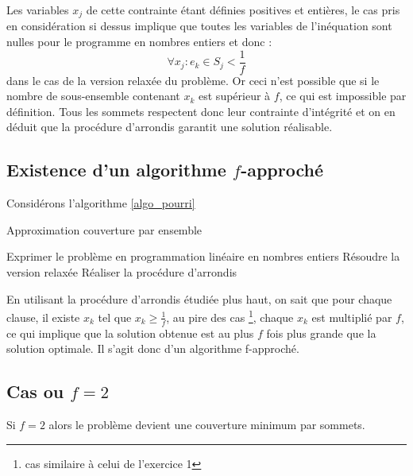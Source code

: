 Les variables $x_j$ de cette contrainte étant définies positives et entières, le cas pris en
considération si dessus implique que toutes les variables de l'inéquation sont nulles pour le
programme en nombres entiers et donc : $$
\forall x_j : e_k \in S_j < \frac{1}{f} $$ dans le cas de la version relaxée du problème. Or ceci
n'est possible que si le nombre de sous-ensemble contenant $x_k$ est supérieur à $f$, ce qui est
impossible par définition. Tous les sommets respectent donc leur contrainte d'intégrité et on en
déduit que la procédure d'arrondis garantit une solution réalisable.

\subsection{Existence d'un algorithme $f$-approché}

Considérons l'algorithme \ref{algo_pourri}
\begin{algorithm}
	\caption{Approximation couverture par ensemble}
	\label{algo_pourri}
	\begin{algorithmic}[1]
		\STATE Exprimer le problème en programmation linéaire en nombres entiers
		\STATE Résoudre la version relaxée
		\STATE Réaliser la procédure d'arrondis
	\end{algorithmic}
\end{algorithm}

En utilisant la procédure d'arrondis étudiée plus haut, on sait que pour chaque clause, il existe
$x_k$ tel que $x_k \geq \frac{1}{f}$, au pire des cas \footnote{cas similaire à celui de l'exercice
1}, chaque $x_k$ est multiplié par $f$, ce qui implique que la solution obtenue est au plus $f$ fois
plus grande que la solution optimale. Il s'agit donc d'un algorithme f-approché.

\subsection{Cas ou $f=2$}

Si $f=2$ alors le problème devient une couverture minimum par sommets.
